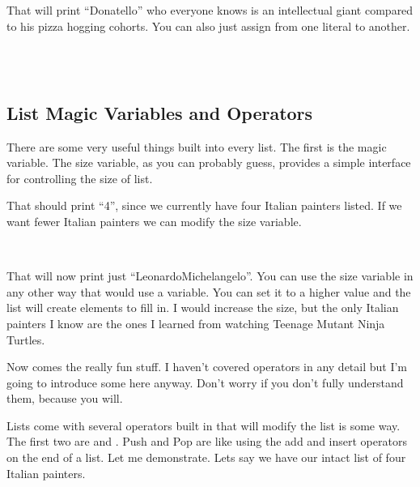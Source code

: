 That will print ``Donatello'' who everyone knows is an intellectual giant compared to his pizza hogging cohorts.  You can also just assign from one literal to another.

\begin{SSCodeBox}
 \\
 \\
\scitea{, }
\scitea{, }
\scitea{;}
\end{SSCodeBox}

\subsection{List Magic Variables and Operators}

There are some very useful things built into every list.  The first is the  magic variable.  The size variable, as you can probably guess, provides a simple interface for controlling the size of list.

\begin{SSCodeBox}
\end{SSCodeBox}

That should print ``4'', since we currently have four Italian painters listed.  If we want fewer Italian painters we can modify the size variable.

\begin{SSCodeBox}
\scitea{;} \\
\end{SSCodeBox}

That will now print just ``LeonardoMichelangelo''.  You can use the size variable in any other way that would use a variable.  You can set it to a higher value and the list will create elements to fill in.  I would increase the size, but the only Italian painters I know are the ones I learned from watching Teenage Mutant Ninja Turtles.

Now comes the really fun stuff.  I haven't covered operators in any detail but I'm going to introduce some here anyway.  Don't worry if you don't fully understand them, because you will.

Lists come with several operators built in that will modify the list is some way.  The first two are  and .  Push and Pop are like using the add and insert operators on the end of a list.  Let me demonstrate.  Lets say we have our intact list of four Italian painters.

